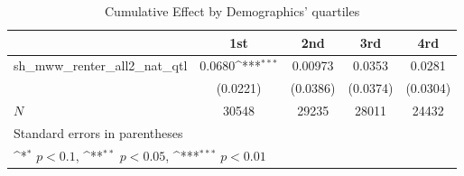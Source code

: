 \begin{table}[htbp]\centering
\def\sym#1{\ifmmode^{#1}\else\(^{#1}\)\fi}
\caption{Cumulative Effect by Demographics' quartiles}
\begin{tabular}{l*{4}{c}}
\hline\hline
            &\multicolumn{1}{c}{1st}&\multicolumn{1}{c}{2nd}&\multicolumn{1}{c}{3rd}&\multicolumn{1}{c}{4rd}\\
\hline
sh\_mww\_renter\_all2\_nat\_qtl&      0.0680\sym{***}&     0.00973         &      0.0353         &      0.0281         \\
            &    (0.0221)         &    (0.0386)         &    (0.0374)         &    (0.0304)         \\
\hline
\(N\)       &       30548         &       29235         &       28011         &       24432         \\
\hline\hline
\multicolumn{5}{l}{\footnotesize Standard errors in parentheses}\\
\multicolumn{5}{l}{\footnotesize \sym{*} \(p<0.1\), \sym{**} \(p<0.05\), \sym{***} \(p<0.01\)}\\
\end{tabular}
\end{table}
